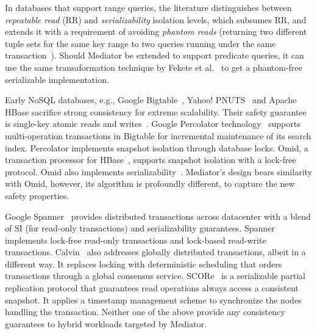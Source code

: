 
In databases that support range queries, the literature distinguishes between {\em repeatable
read\/} (RR) and {\em serializability\/} isolation levels, %
which subsumes RR, and extends it with a requirement of avoiding {\em phantom
reads\/} (returning two different tuple sets for the same key range to two queries running under the same 
transaction~\cite{GrayTP1993}).  Should Mediator be extended to support
predicate queries, it can use the same transaformation technique
by Fekete et al.~\cite{FeketeTODS2005} to get a phantom-free serializable
implementation.
  
Early NoSQL databases, e.g., Google Bigtable~\cite{BigTable2006}, Yahoo! 
PNUTS~\cite{PNUTS2008} and Apache HBase sacrifice strong consistency for extreme 
scalability. Their safety guarantee is single-key atomic reads and writes~\cite{AttiyaDC2004}. 
Google Percolator technology~\cite{Percolator2010} supports multi-operation transactions in Bigtable for incremental maintenance 
of its search index. Percolator
implements snapshot isolation through database locks. Omid, a transaction 
processor for HBase~\cite{Omid2014}, supports snapshot isolation with a
lock-free protocol. Omid also implements serializability~\cite{OmidEurosys2012}.
Mediator's design bears similarity with Omid,
however, its algorithm is profoundly different, to capture the new safety properties. 

Google Spanner~\cite{Spanner2012} provides distributed transactions 
across datacenter with a blend of SI (for read-only transactions) and serializability guarantees. 
Spanner implements lock-free read-only transactions and lock-based read-write
transactions. 
Calvin~\cite{calvin} also addresses globally distributed transactions, albeit in
a different way. It replaces locking with deterministic scheduling that orders
transactions through a global consensus service. 
SCORe~\cite{Peluso2012} is a serializable partial replication protocol that
guarantees read operations always access a consistent snapshot. It applies a
timestamp management scheme to synchronize the nodes handling the
transaction. Neither one of the above
provide any consistency guarantees to hybrid workloads targeted by Mediator. 

